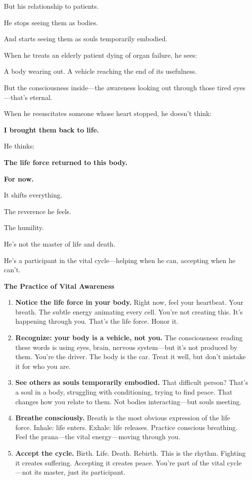 \documentclass[11pt,twoside]{book}
\begin{document}
But his relationship to patients.

He stops seeing them as bodies.

And starts seeing them as souls temporarily embodied.

When he treats an elderly patient dying of organ failure, he sees:

A body wearing out. A vehicle reaching the end of its usefulness.

But the consciousness inside—the awareness looking out through those tired eyes—that's eternal.

When he resuscitates someone whose heart stopped, he doesn't think:

\textbf{I brought them back to life.}

He thinks:

\textbf{The life force returned to this body.}

\textbf{For now.}

It shifts everything.

The reverence he feels.

The humility.

He's not the master of life and death.

He's a participant in the vital cycle—helping when he can, accepting when he can't.

\begin{practicebox}
\textbf{The Practice of Vital Awareness}

\begin{enumerate}
\item \textbf{Notice the life force in your body.} Right now, feel your heartbeat. Your breath. The subtle energy animating every cell. You're not creating this. It's happening through you. That's the life force. Honor it.

\item \textbf{Recognize: your body is a vehicle, not you.} The consciousness reading these words is using eyes, brain, nervous system—but it's not produced by them. You're the driver. The body is the car. Treat it well, but don't mistake it for who you are.

\item \textbf{See others as souls temporarily embodied.} That difficult person? That's a soul in a body, struggling with conditioning, trying to find peace. That changes how you relate to them. Not bodies interacting—but souls meeting.

\item \textbf{Breathe consciously.} Breath is the most obvious expression of the life force. Inhale: life enters. Exhale: life releases. Practice conscious breathing. Feel the prana—the vital energy—moving through you.

\item \textbf{Accept the cycle.} Birth. Life. Death. Rebirth. This is the rhythm. Fighting it creates suffering. Accepting it creates peace. You're part of the vital cycle—not its master, just its participant.
\end{enumerate}
\end{practicebox}
\end{document}
